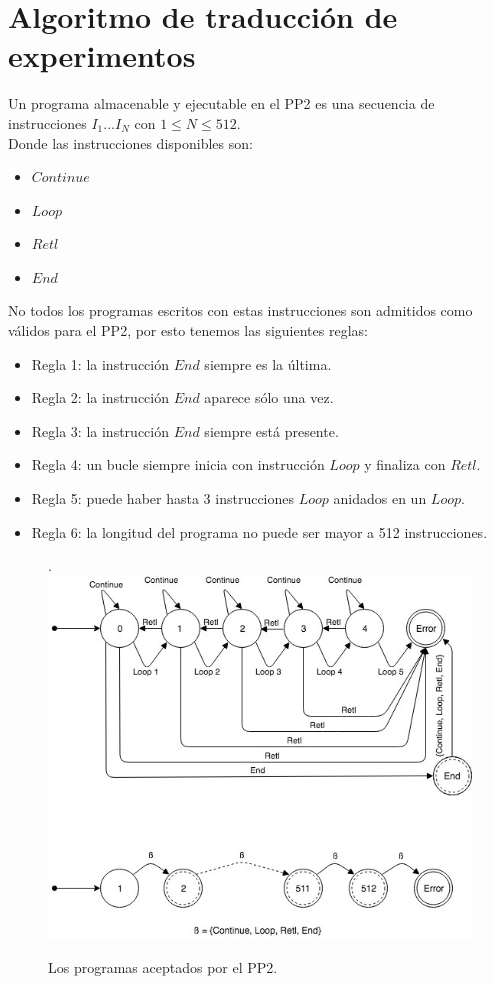 \section{Algoritmo de traducci\'on de experimentos}

Un programa almacenable y ejecutable en el PP2 es una secuencia de 
instrucciones \(I_{1} ... I_{N}\) con \(1 \leq N \leq 512 \).
\\
Donde las instrucciones disponibles son:

\begin{itemize}
    \item $Continue$
    \item $Loop$
    \item $Retl$
    \item $End$
\end{itemize}

\noindent
No todos los programas escritos con estas instrucciones son admitidos 
como v\'alidos para el PP2, por esto tenemos las siguientes reglas:

\begin{itemize}
\item Regla 1: la instrucci\'on $End$ siempre es la \'ultima.
\item Regla 2: la instrucci\'on $End$ aparece s\'olo una vez.
\item Regla 3: la instrucci\'on $End$ siempre est\'a presente.
\item Regla 4: un bucle siempre inicia con instrucci\'on $Loop$ y finaliza con $Retl$.
\item Regla 5: puede haber hasta 3 instrucciones $Loop$ anidados en un $Loop$.
\item Regla 6: la longitud del programa no puede ser mayor a 512 instrucciones.
\end{itemize}

\begin{figure}[!htb].
    \includegraphics[width=\linewidth]{../figures/d12.jpg}
    \caption{Los programas aceptados por el PP2.}
    \label{fig:d12}
\end{figure}
 
